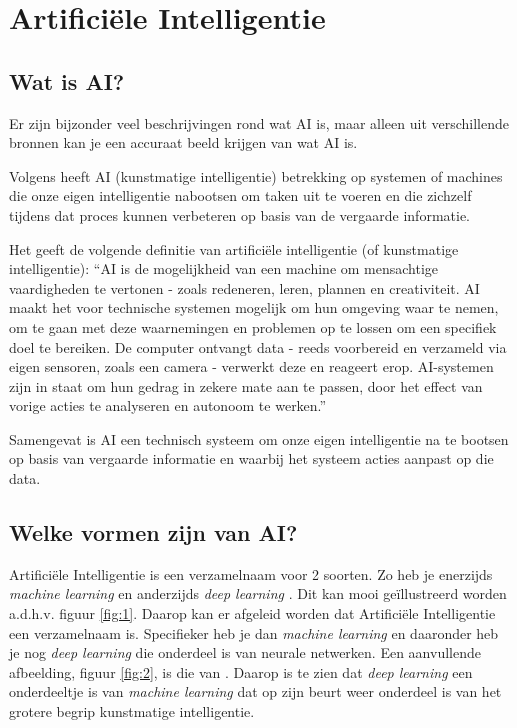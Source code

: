\section{Artificiële Intelligentie}
\subsection{Wat is AI?}
Er zijn bijzonder veel beschrijvingen rond wat AI is, maar alleen uit verschillende bronnen kan je een accuraat beeld krijgen van wat AI is.

Volgens \textcite{Oracle2014} heeft AI (kunstmatige intelligentie) betrekking op systemen of machines die onze eigen intelligentie nabootsen om taken uit te voeren en die zichzelf tijdens dat proces kunnen verbeteren op basis van de vergaarde informatie.

Het \textcite{EuropeesParlement2020} geeft de volgende definitie van artificiële intelligentie (of kunstmatige intelligentie): ``AI is de mogelijkheid van een machine om mensachtige vaardigheden te vertonen - zoals redeneren, leren, plannen en creativiteit.
AI maakt het voor technische systemen mogelijk om hun omgeving waar te nemen, om te gaan met deze waarnemingen en problemen op te lossen om een specifiek doel te bereiken. De computer ontvangt data - reeds voorbereid en verzameld via eigen sensoren, zoals een camera - verwerkt deze en reageert erop.
AI-systemen zijn in staat om hun gedrag in zekere mate aan te passen, door het effect van vorige acties te analyseren en autonoom te werken.''

Samengevat is AI een technisch systeem om onze eigen intelligentie na te bootsen op basis van vergaarde informatie en waarbij het systeem acties aanpast op die data.

\subsection{Welke vormen zijn van AI?}
Artificiële Intelligentie is een verzamelnaam voor 2 soorten. Zo heb je enerzijds \textit{machine learning} en anderzijds \textit{deep learning} \autocite{Kavlakoglu2020}.
Dit kan mooi geïllustreerd worden a.d.h.v. figuur \ref{fig:1}. Daarop kan er afgeleid worden dat Artificiële Intelligentie een verzamelnaam is. Specifieker heb je dan \textit{machine learning} en daaronder heb je nog \textit{deep learning} die onderdeel is van neurale netwerken. Een aanvullende afbeelding, figuur \ref{fig:2}, is die van \textcite{Bansal2019}. Daarop is te zien dat \textit{deep learning} een onderdeeltje is van \textit{machine learning} dat op zijn beurt weer onderdeel is van het grotere begrip kunstmatige intelligentie.

